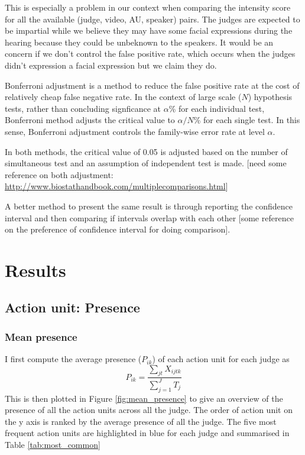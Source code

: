 \documentclass{monashthesis}
\begin{document}
This is especially a problem in our context when comparing the intensity score for all the available (judge, video, AU, speaker) pairs. The judges are expected to be impartial while we believe they may have some facial expressions during the hearing because they could be unbeknown to the speakers. It would be an concern if we don't control the false positive rate, which occurs when the judges didn't expression a facial expression but we claim they do.

Bonferroni adjustment \autocites{rupert2012simultaneous}{efron2016computer} is a method to reduce the false positive rate at the cost of relatively cheap false negative rate. In the context of large scale (\(N\)) hypothesis tests, rather than concluding signficance at \(\alpha\)\% for each individual test, Bonferroni method adjusts the critical value to \(\alpha/N\)\% for each single test. In this sense, Bonferroni adjustment controls the family-wise error rate at level \(\alpha\).

In both methods, the critical value of 0.05 is adjusted based on the number of simultaneous test and an assumption of independent test is made. {[}need some reference on both adjustment: \url{http://www.biostathandbook.com/multiplecomparisons.html}{]}

A better method to present the same result is through reporting the confidence interval and then comparing if intervals overlap with each other {[}some reference on the preference of confidence interval for doing comparison{]}.

\hypertarget{results}{%
\chapter{Results}\label{results}}

\hypertarget{action-unit-presence}{%
\section{Action unit: Presence}\label{action-unit-presence}}

\hypertarget{mean-presence}{%
\subsection{Mean presence}\label{mean-presence}}

I first compute the average presence (\(P_{ik}\)) of each action unit for each judge as \[P_{ik} = \frac{\sum_{jt}X_{ijtk}}{\sum_{j = 1}^JT_j}\] This is then plotted in Figure \ref{fig:mean_presence} to give an overview of the presence of all the action units across all the judge. The order of action unit on the y axis is ranked by the average presence of all the judge. The five most frequent action units are highlighted in blue for each judge and summarised in Table \ref{tab:most_common}
\end{document}
